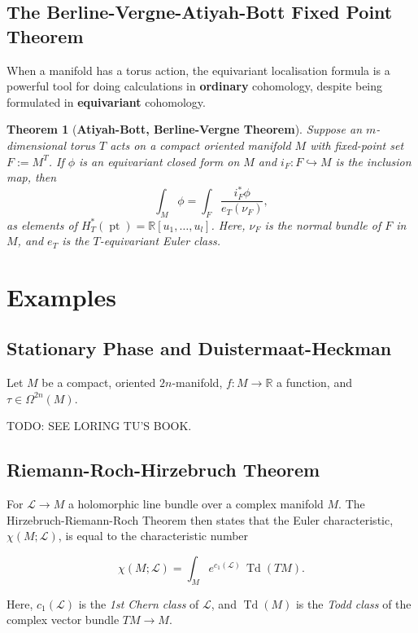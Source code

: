 \documentclass{article}
\newtheorem{theorem}{Theorem}[section]
\newcommand{\ra}{\rightarrow}
\newcommand{\W}{\Omega}
\newcommand{\RR}{\mathbb{R}}
\newcommand{\mcL}{\mathcal{L}}
\DeclareMathOperator{\Td}{Td}
\DeclareMathOperator{\pt}{pt}
\begin{document}
\subsection{The Berline-Vergne-Atiyah-Bott Fixed Point Theorem}

When a manifold has a torus action, the equivariant localisation formula is a powerful tool for doing calculations in \textbf{ordinary} cohomology, despite being formulated in \textbf{equivariant} cohomology.

\begin{theorem}[\textbf{Atiyah-Bott, Berline-Vergne Theorem}]
	Suppose an $m$-dimensional torus $T$ acts on a compact oriented manifold $M$ with fixed-point set $F := M^{T}$. If $\phi$ is an equivariant closed form on $M$ and $i_{F}: F \hookrightarrow M$ is the inclusion map, then
	\begin{equation*}
		\int_{M} \phi = \int_{F} \frac{i_{F}^{\ast} \phi}{e_{T}(\nu_{F})},
	\end{equation*}
	as elements of $H_{T}^{\ast}(\pt) = \RR[u_{1}, \ldots, u_{l}]$. Here, $\nu_{F}$ is the normal bundle of $F$ in $M$, and $e_{T}$ is the $T$-equivariant Euler class.
\end{theorem}

\section{Examples}

\subsection{Stationary Phase and Duistermaat-Heckman}

Let $M$ be a compact, oriented $2n$-manifold, $f : M \ra \RR$ a function, and $\tau \in \W^{2n}(M)$.

TODO: SEE LORING TU'S BOOK.

\subsection{Riemann-Roch-Hirzebruch Theorem}

For $\mcL \ra M$ a holomorphic line bundle over a complex manifold $M$. The Hirzebruch-Riemann-Roch Theorem then states that the Euler characteristic, $\chi(M; \mcL)$, is equal to the characteristic number

\begin{equation*}
	\chi(M; \mcL) =	\int_{M} e^{c_{1}(\mcL)}\, \Td(TM).
\end{equation*}

Here, $c_{1}(\mcL)$ is the \emph{1st Chern class} of $\mcL$, and $\Td(M)$ is the \emph{Todd class} of the complex vector bundle $TM \ra M$.







  


\end{document}
